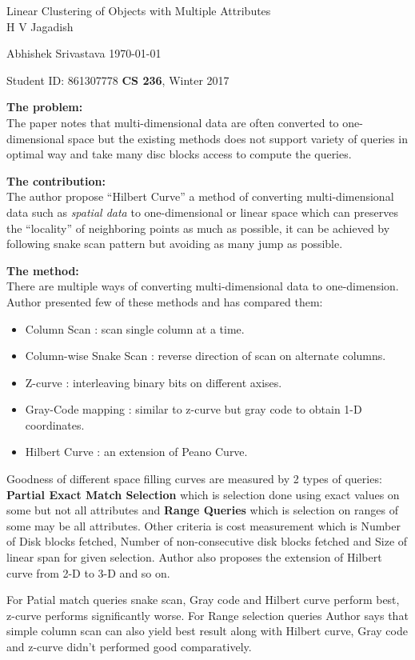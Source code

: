 \documentclass[a4paper,12pt, twoside]{article}
\renewcommand{\maketitle}{%
 	\Large
 	\begin{center}
 	Linear Clustering of Objects with Multiple Attributes \\	
 	\normalsize H V Jagadish
 	\end{center}
 
 	\Large
	Abhishek Srivastava
	\hfill
	\normalsize
	\today
 	\par
 	Student ID: 861307778
 	\hfill
 	\textbf{CS 236}, Winter 2017
 	\par 	
 	\hrulefill
 	\par
 	}
\begin{document}
\thispagestyle{empty}
	
\maketitle

\textbf{The problem:}\\
The paper notes that multi-dimensional data are often converted to one-dimensional space but the existing methods does not support variety of queries in optimal way and take many disc blocks access to compute the queries.

\textbf{The contribution:}\\
The author propose ``Hilbert Curve'' a method of converting multi-dimensional data such as \emph{spatial data} to one-dimensional or linear space which can preserves the ``locality'' of neighboring points as much as possible, it can be achieved by following snake scan pattern but avoiding as many jump as possible.

\textbf{The method:}\\
There are multiple ways of converting multi-dimensional data to one-dimension. Author presented few of these methods and has compared them: 
\begin{itemize}
	\item Column Scan : scan single column at a time.
	\item Column-wise Snake Scan : reverse direction of scan on alternate columns.
	\item Z-curve : interleaving binary bits on different axises.
	\item Gray-Code mapping : similar to z-curve but gray code to obtain 1-D coordinates. 
	\item Hilbert Curve : an extension of Peano Curve.
\end{itemize}

Goodness of different space filling curves are measured by 2 types of queries: \textbf{Partial Exact Match Selection} which is selection done using exact values on some but not all attributes and \textbf{Range Queries} which is selection on ranges of some may be all attributes. Other criteria is cost measurement which is Number of Disk blocks fetched, Number of non-consecutive disk blocks fetched and Size of linear span for given selection. Author also proposes the extension of Hilbert curve from 2-D to 3-D and so on.

For Patial match queries snake scan, Gray code and Hilbert curve perform best, z-curve performs significantly worse. For Range selection queries Author says that simple column scan can also yield best result along with Hilbert curve, Gray code and z-curve didn't performed good comparatively.
\end{document}

